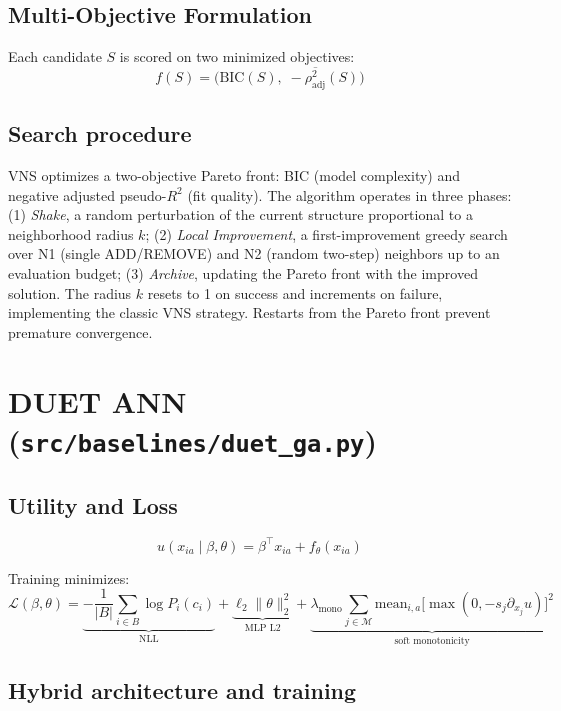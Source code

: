 \documentclass[11pt,a4paper]{article}
\begin{document}
\subsection{Multi-Objective Formulation}

Each candidate $S$ is scored on two minimized objectives:
\[
f(S) = \bigl(\text{BIC}(S),\; -\overline{\rho^2_{\text{adj}}}(S)\bigr)
\]

\subsection{Search procedure}

VNS optimizes a two-objective Pareto front: BIC (model complexity) and negative adjusted pseudo-$R^2$ (fit quality).  The algorithm operates in three phases: (1) \emph{Shake}, a random perturbation of the current structure proportional to a neighborhood radius $k$; (2) \emph{Local Improvement}, a first-improvement greedy search over N1 (single ADD/REMOVE) and N2 (random two-step) neighbors up to an evaluation budget; (3) \emph{Archive}, updating the Pareto front with the improved solution.  The radius $k$ resets to 1 on success and increments on failure, implementing the classic VNS strategy.  Restarts from the Pareto front prevent premature convergence.


\section{DUET ANN (\texttt{src/baselines/duet\_ga.py})}
\label{sec:duet}

\subsection{Utility and Loss}

\[
u(x_{ia} \mid \beta, \theta) = \beta^\top x_{ia} + f_\theta(x_{ia})
\]

Training minimizes:
\[
\mathcal{L}(\beta, \theta) = \underbrace{-\frac{1}{|B|}\sum_{i \in B} \log P_i(c_i)}_{\text{NLL}} + \underbrace{\ell_2 \|\theta\|_2^2}_{\text{MLP L2}} + \underbrace{\lambda_{\text{mono}} \sum_{j \in \mathcal{M}} \text{mean}_{i,a}\bigl[\max(0, -s_j \partial_{x_j} u)\bigr]^2}_{\text{soft monotonicity}}
\]

\subsection{Hybrid architecture and training}
\end{document}
